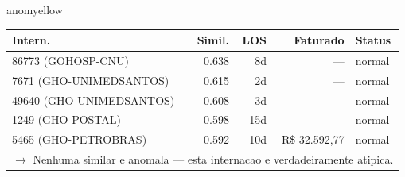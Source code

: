 \documentclass[a4paper,10pt]{article}
\begin{document}
\begin{anomalycard}[Internacao 80407 | PASA | MODERADO (z=2.20)]{anomyellow}
\begin{tabular}{l r r r l}\toprule\textbf{Intern.} & \textbf{Simil.} & \textbf{LOS} & \textbf{Faturado} & \textbf{Status} \\\midrule
86773 (GOHOSP-CNU) & 0.638 & 8d & --- & \textcolor{jcubeblue}{normal} \\
7671 (GHO-UNIMEDSANTOS) & 0.615 & 2d & --- & \textcolor{jcubeblue}{normal} \\
49640 (GHO-UNIMEDSANTOS) & 0.608 & 3d & --- & \textcolor{jcubeblue}{normal} \\
1249 (GHO-POSTAL) & 0.598 & 15d & --- & \textcolor{jcubeblue}{normal} \\
5465 (GHO-PETROBRAS) & 0.592 & 10d & R\$ 32.592,77 & \textcolor{jcubeblue}{normal} \\
\multicolumn{5}{l}{\textcolor{jcubeblue}{\small $\rightarrow$ Nenhuma similar e anomala --- esta internacao e verdadeiramente atipica.}} \\
\bottomrule\end{tabular}



\end{anomalycard}

\newpage
\end{document}
